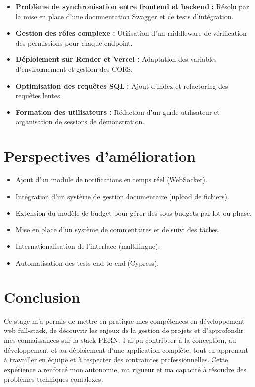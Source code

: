 \documentclass[12pt,a4paper]{report}
\begin{document}
\begin{itemize}
    \item \textbf{Problème de synchronisation entre frontend et backend :} Résolu par la mise en place d’une documentation Swagger et de tests d’intégration.
    \item \textbf{Gestion des rôles complexe :} Utilisation d’un middleware de vérification des permissions pour chaque endpoint.
    \item \textbf{Déploiement sur Render et Vercel :} Adaptation des variables d’environnement et gestion des CORS.
    \item \textbf{Optimisation des requêtes SQL :} Ajout d’index et refactoring des requêtes lentes.
    \item \textbf{Formation des utilisateurs :} Rédaction d’un guide utilisateur et organisation de sessions de démonstration.
\end{itemize}

\chapter{Perspectives d’amélioration}

\begin{itemize}
    \item Ajout d’un module de notifications en temps réel (WebSocket).
    \item Intégration d’un système de gestion documentaire (upload de fichiers).
    \item Extension du modèle de budget pour gérer des sous-budgets par lot ou phase.
    \item Mise en place d’un système de commentaires et de suivi des tâches.
    \item Internationalisation de l’interface (multilingue).
    \item Automatisation des tests end-to-end (Cypress).
\end{itemize}

\chapter{Conclusion}

Ce stage m’a permis de mettre en pratique mes compétences en développement web full-stack, de découvrir les enjeux de la gestion de projets et d’approfondir mes connaissances sur la stack PERN. J’ai pu contribuer à la conception, au développement et au déploiement d’une application complète, tout en apprenant à travailler en équipe et à respecter des contraintes professionnelles. Cette expérience a renforcé mon autonomie, ma rigueur et ma capacité à résoudre des problèmes techniques complexes.
\end{document}

